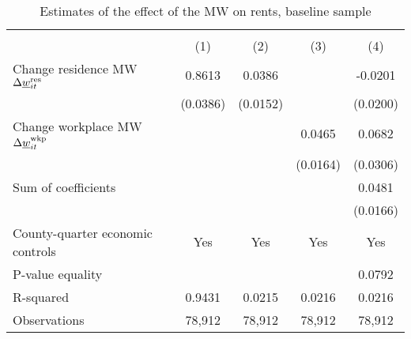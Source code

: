 \begin{table}[hbt!] \centering
    \caption{Estimates of the effect of the MW on rents, baseline sample}
    \label{tab:static}
    \begin{tabular}{l*{4}{c}}
        \toprule
        & 
            &  \\ \cmidrule(lr){2-2}\cmidrule(lr){3-5}
                                           & (1)   & (2)   & (3)   & (4)            \\ \midrule
        Change residence MW 
                  $\Delta\underline{w}_{it}^{\text{res}}$  &  0.8613  &  0.0386  &       &  -0.0201     \\
                                           & (0.0386) & (0.0152) &       & (0.0200)    \\
        Change workplace MW 
                   $\Delta\underline{w}_{it}^{\text{wkp}}$ &       &       &  0.0465  & 0.0682      \\
                                           &       &       & (0.0164) & (0.0306)    \\ \midrule
        Sum of coefficients                &       &       &       &  0.0481     \\
                                           &       &       &       & (0.0166)    \\ \midrule
        County-quarter economic controls   &  Yes  & Yes   & Yes   & Yes      \\
        P-value equality                   &       &       &       & 0.0792      \\
        R-squared                          &  0.9431  &  0.0215  &  0.0216  & 0.0216      \\
        Observations                       & 78,912  & 78,912  & 78,912  & 78,912     \\\bottomrule
    \end{tabular}


\end{table}
